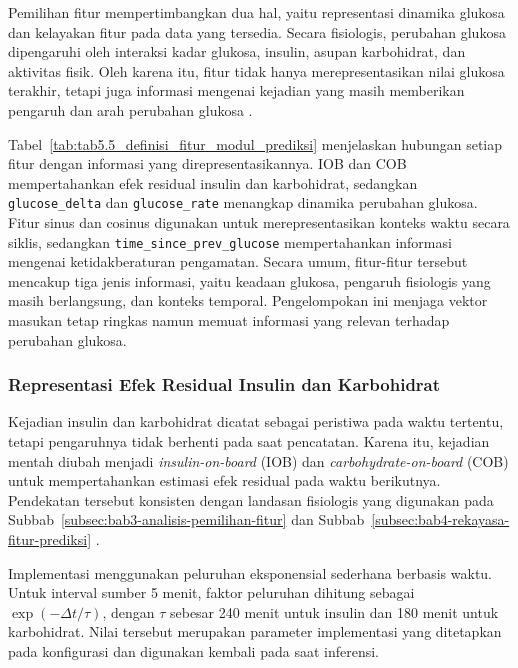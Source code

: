 Pemilihan fitur mempertimbangkan dua hal, yaitu representasi dinamika glukosa dan kelayakan fitur pada data yang tersedia. Secara fisiologis, perubahan glukosa dipengaruhi
oleh interaksi kadar glukosa, insulin, asupan karbohidrat, dan aktivitas fisik. Oleh karena itu, fitur tidak hanya merepresentasikan nilai glukosa terakhir, tetapi juga
informasi mengenai kejadian yang masih memberikan pengaruh dan arah perubahan glukosa \cite{bergman1979,dallaman2014,colberg2016}.



Tabel~\ref{tab:tab5.5_definisi_fitur_modul_prediksi} menjelaskan hubungan setiap fitur dengan informasi yang direpresentasikannya. IOB dan COB mempertahankan
efek residual insulin dan karbohidrat, sedangkan \texttt{glucose\_delta} dan \texttt{glucose\_rate} menangkap dinamika perubahan glukosa. Fitur sinus dan cosinus
digunakan untuk merepresentasikan konteks waktu secara siklis, sedangkan \texttt{time\_since\_prev\_glucose} mempertahankan informasi mengenai ketidakberaturan
pengamatan. Secara umum, fitur-fitur tersebut mencakup tiga jenis informasi, yaitu keadaan glukosa, pengaruh fisiologis yang masih berlangsung, dan konteks temporal.
Pengelompokan ini menjaga vektor masukan tetap ringkas namun memuat informasi yang relevan terhadap perubahan glukosa.

\subsubsection{Representasi Efek Residual Insulin dan Karbohidrat}
\label{subsubsec:bab5-iob-cob}

Kejadian insulin dan karbohidrat dicatat sebagai peristiwa pada waktu tertentu, tetapi pengaruhnya tidak berhenti pada saat pencatatan. Karena itu, kejadian mentah
diubah menjadi \textit{insulin-on-board} (IOB) dan \textit{carbohydrate-on-board} (COB) untuk mempertahankan estimasi efek residual pada waktu berikutnya.
Pendekatan tersebut konsisten dengan landasan fisiologis yang digunakan pada Subbab~\ref{subsec:bab3-analisis-pemilihan-fitur} dan
Subbab~\ref{subsec:bab4-rekayasa-fitur-prediksi} \cite{bergman1979,dallaman2014}.

Implementasi menggunakan peluruhan eksponensial sederhana berbasis waktu. Untuk interval sumber 5 menit, faktor peluruhan dihitung sebagai
$\exp(-\Delta t/\tau)$, dengan $\tau$ sebesar 240 menit untuk insulin dan 180 menit untuk karbohidrat. Nilai tersebut merupakan parameter implementasi yang
ditetapkan pada konfigurasi dan digunakan kembali pada saat inferensi.

